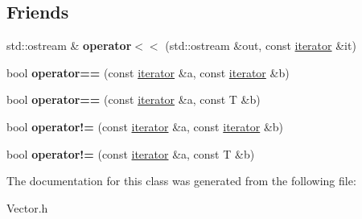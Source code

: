 \subsection*{Friends}
\begin{DoxyCompactItemize}
\item 
\mbox{\label{class_vector_1_1iterator_a7fcdd7df919086edd42979aac9a7a4d8}} 
std\+::ostream \& {\bfseries operator$<$$<$} (std\+::ostream \&out, const \mbox{\hyperlink{class_vector_1_1iterator}{iterator}} \&it)
\item 
\mbox{\label{class_vector_1_1iterator_a81d10d7799462c7ca5e7cf19119ca356}} 
bool {\bfseries operator==} (const \mbox{\hyperlink{class_vector_1_1iterator}{iterator}} \&a, const \mbox{\hyperlink{class_vector_1_1iterator}{iterator}} \&b)
\item 
\mbox{\label{class_vector_1_1iterator_aea4730e8e5493b523849c48501ef73aa}} 
bool {\bfseries operator==} (const \mbox{\hyperlink{class_vector_1_1iterator}{iterator}} \&a, const T \&b)
\item 
\mbox{\label{class_vector_1_1iterator_a55a8ee0e80dad1a7da9d751c25bc0386}} 
bool {\bfseries operator!=} (const \mbox{\hyperlink{class_vector_1_1iterator}{iterator}} \&a, const \mbox{\hyperlink{class_vector_1_1iterator}{iterator}} \&b)
\item 
\mbox{\label{class_vector_1_1iterator_a9baa8ab096acb0f0cf98533b4c0ac4c3}} 
bool {\bfseries operator!=} (const \mbox{\hyperlink{class_vector_1_1iterator}{iterator}} \&a, const T \&b)
\end{DoxyCompactItemize}


The documentation for this class was generated from the following file\+:\begin{DoxyCompactItemize}
\item 
Vector.\+h\end{DoxyCompactItemize}
